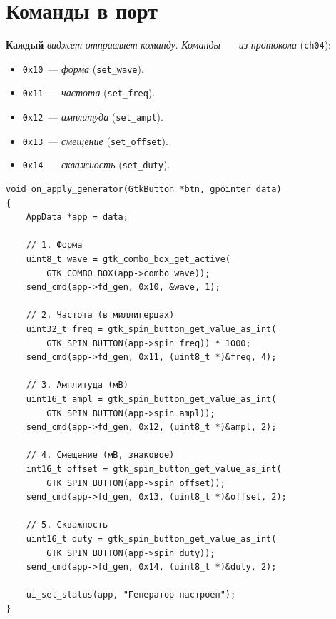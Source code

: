 \section{Команды в порт}
\label{sec:gen-ui-commands}

\textbf{Каждый} \emph{виджет} \emph{отправляет} \emph{команду}.
\emph{Команды}~--- \emph{из} \emph{протокола} (\texttt{ch04}):

\begin{itemize}
    \item \texttt{0x10}~--- \emph{форма} (\texttt{set\_wave}).
    \item \texttt{0x11}~--- \emph{частота} (\texttt{set\_freq}).
    \item \texttt{0x12}~--- \emph{амплитуда} (\texttt{set\_ampl}).
    \item \texttt{0x13}~--- \emph{смещение} (\texttt{set\_offset}).
    \item \texttt{0x14}~--- \emph{скважность} (\texttt{set\_duty}).
\end{itemize}

\begin{listing}[htbp]
\begin{verbatim}
void on_apply_generator(GtkButton *btn, gpointer data)
{
    AppData *app = data;

    // 1. Форма
    uint8_t wave = gtk_combo_box_get_active(
        GTK_COMBO_BOX(app->combo_wave));
    send_cmd(app->fd_gen, 0x10, &wave, 1);

    // 2. Частота (в миллигерцах)
    uint32_t freq = gtk_spin_button_get_value_as_int(
        GTK_SPIN_BUTTON(app->spin_freq)) * 1000;
    send_cmd(app->fd_gen, 0x11, (uint8_t *)&freq, 4);

    // 3. Амплитуда (мВ)
    uint16_t ampl = gtk_spin_button_get_value_as_int(
        GTK_SPIN_BUTTON(app->spin_ampl));
    send_cmd(app->fd_gen, 0x12, (uint8_t *)&ampl, 2);

    // 4. Смещение (мВ, знаковое)
    int16_t offset = gtk_spin_button_get_value_as_int(
        GTK_SPIN_BUTTON(app->spin_offset));
    send_cmd(app->fd_gen, 0x13, (uint8_t *)&offset, 2);

    // 5. Скважность
    uint16_t duty = gtk_spin_button_get_value_as_int(
        GTK_SPIN_BUTTON(app->spin_duty));
    send_cmd(app->fd_gen, 0x14, (uint8_t *)&duty, 2);

    ui_set_status(app, "Генератор настроен");
}
\end{verbatim}
\caption{\texttt{on\_apply\_generator()}: отправка команд}
\label{lst:gen-ui-apply}
\end{listing}

